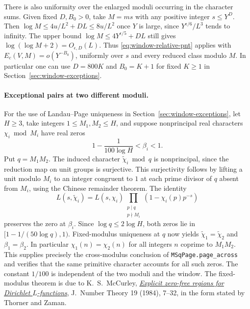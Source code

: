 There is also uniformity over the enlarged moduli occurring in
the character sums. Given fixed \(D,B_0>0\), take \(M=ms\)
with any positive integer \(s\le Y^D\). Then
\(\log M\le4u/L^2+DL\le8u/L^2\) once \(Y\) is large, since
\(Y^{\epsilon/6}/L^3\) tends to infinity. The upper bound
\(\log M\le4Y^{\epsilon/5}+DL\) still gives
\(\log(\log M+2)=O_{\epsilon,D}(L)\).
Thus \eqref{eq:window-relative-pnt} applies with
\(E_c(V,M)=o(Y^{-B_0})\), uniformly over \(s\) and every reduced
class modulo \(M\). In particular one can use \(D=800K\) and
\(B_0=K+1\) for fixed \(K\ge1\) in Section~\ref{sec:window-exceptions}.

\paragraph{Exceptional pairs at two different moduli.}
For the use of Landau--Page uniqueness in
Section~\ref{sec:window-exceptions}, let \(H\ge3\), take integers
\(1\le M_1,M_2\le H\), and suppose nonprincipal real characters
\(\chi_i\bmod M_i\) have real zeros
\[
                  1-\frac{1}{100\log H}<\beta_i<1 .
\]
Put \(q=M_1M_2\). The induced character \(\widetilde\chi_i\bmod q\)
is nonprincipal, since the reduction map on unit groups is
surjective. This surjectivity follows by lifting a unit modulo
\(M_i\) to an integer congruent to \(1\) at each prime divisor of
\(q\) absent from \(M_i\), using the Chinese remainder theorem.
The identity
\[
 L(s,\widetilde\chi_i)=L(s,\chi_i)
   \prod_{\substack{p\mid q\\p\nmid M_i}}(1-\chi_i(p)p^{-s})
\]
preserves the zero at \(\beta_i\).
Since \(\log q\le2\log H\), both zeros lie in
\([1-1/(50\log q),1)\). Fixed-modulus uniqueness at \(q\) now yields
\(\widetilde\chi_1=\widetilde\chi_2\) and \(\beta_1=\beta_2\).
In particular \(\chi_1(n)=\chi_2(n)\) for all integers \(n\)
coprime to \(M_1M_2\). This supplies precisely the cross-modulus
conclusion of \texttt{MSqPage.page\_across} and verifies that the
same primitive character accounts for all such zeros. The constant
\(1/100\) is independent of the two moduli and the window. The
fixed-modulus theorem is due to K.~S.~McCurley,
\href{https://doi.org/10.1016/0022-314X(84)90089-1}{\emph{Explicit
zero-free regions for Dirichlet \(L\)-functions}}, J.~Number Theory
19 (1984), 7--32, in the form stated by Thorner and Zaman.

